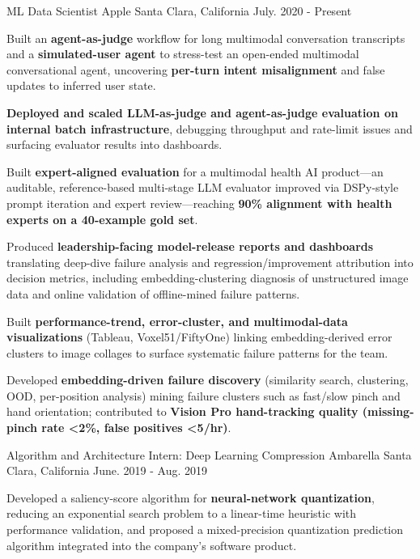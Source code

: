 \begin{cventries}
    \cventry
    {ML Data Scientist}
    {Apple}
    {Santa Clara, California}
    {July. 2020 - Present}
    {
      \begin{cvitems}
\item{Built an \textbf{agent-as-judge} workflow for long multimodal conversation transcripts and a \textbf{simulated-user agent} to stress-test an open-ended multimodal conversational agent, uncovering \textbf{per-turn intent misalignment} and false updates to inferred user state.}
\item{\textbf{Deployed and scaled LLM-as-judge and agent-as-judge evaluation on internal batch infrastructure}, debugging throughput and rate-limit issues and surfacing evaluator results into dashboards.}
\item{Built \textbf{expert-aligned evaluation} for a multimodal health AI product---an auditable, reference-based multi-stage LLM evaluator improved via DSPy-style prompt iteration and expert review---reaching \textbf{90\% alignment with health experts on a 40-example gold set}.}
\item{Produced \textbf{leadership-facing model-release reports and dashboards} translating deep-dive failure analysis and regression/improvement attribution into decision metrics, including embedding-clustering diagnosis of unstructured image data and online validation of offline-mined failure patterns.}
\item{Built \textbf{performance-trend, error-cluster, and multimodal-data visualizations} (Tableau, Voxel51/FiftyOne) linking embedding-derived error clusters to image collages to surface systematic failure patterns for the team.}
\item{Developed \textbf{embedding-driven failure discovery} (similarity search, clustering, OOD, per-position analysis) mining failure clusters such as fast/slow pinch and hand orientation; contributed to \textbf{Vision Pro hand-tracking quality (missing-pinch rate <2\%, false positives <5/hr)}.}
\end{cvitems}}

    \cventry
    {Algorithm and Architecture Intern: Deep Learning Compression}
    {Ambarella}
    {Santa Clara, California}
    {June. 2019 - Aug. 2019}
    {
      \begin{cvitems}
        \item{Developed a saliency-score algorithm for \textbf{neural-network quantization}, reducing an exponential search problem to a linear-time heuristic with performance validation, and proposed a mixed-precision quantization prediction algorithm integrated into the company's software product.}
      \end{cvitems}
    }
\end{cventries}
